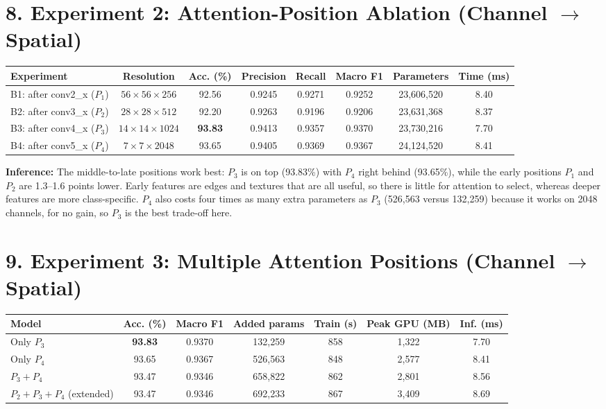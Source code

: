 \documentclass[10pt]{article}
\begin{document}
\section*{8. Experiment 2: Attention-Position Ablation (Channel $\rightarrow$ Spatial)}

\begin{center}
\small
\begin{tabular}{|l|c|c|c|c|c|c|c|}
\hline
Experiment & Resolution & Acc. (\%) & Precision & Recall & Macro F1 & Parameters & Time (ms)\\
\hline
B1: after conv2\_x ($P_1$) & $56\times56\times256$ & 92.56 & 0.9245 & 0.9271 & 0.9252 & 23{,}606{,}520 & 8.40\\
B2: after conv3\_x ($P_2$) & $28\times28\times512$ & 92.20 & 0.9263 & 0.9196 & 0.9206 & 23{,}631{,}368 & 8.37\\
B3: after conv4\_x ($P_3$) & $14\times14\times1024$ & \textbf{93.83} & 0.9413 & 0.9357 & 0.9370 & 23{,}730{,}216 & 7.70\\
B4: after conv5\_x ($P_4$) & $7\times7\times2048$ & 93.65 & 0.9405 & 0.9369 & 0.9367 & 24{,}124{,}520 & 8.41\\
\hline
\end{tabular}
\end{center}

\textbf{Inference:} The middle-to-late positions work best: $P_3$ is on top
(93.83\%) with $P_4$ right behind (93.65\%), while the early positions $P_1$
and $P_2$ are 1.3--1.6 points lower. Early features are edges and textures
that are all useful, so there is little for attention to select, whereas
deeper features are more class-specific. $P_4$ also costs four times as
many extra parameters as $P_3$ (526{,}563 versus 132{,}259) because it
works on 2048 channels, for no gain, so $P_3$ is the best trade-off here.

\section*{9. Experiment 3: Multiple Attention Positions (Channel $\rightarrow$ Spatial)}

\begin{center}
\small
\begin{tabular}{|l|c|c|c|c|c|c|}
\hline
Model & Acc. (\%) & Macro F1 & Added params & Train (s) & Peak GPU (MB) & Inf. (ms)\\
\hline
Only $P_3$ & \textbf{93.83} & 0.9370 & 132{,}259 & 858 & 1{,}322 & 7.70\\
Only $P_4$ & 93.65 & 0.9367 & 526{,}563 & 848 & 2{,}577 & 8.41\\
$P_3+P_4$ & 93.47 & 0.9346 & 658{,}822 & 862 & 2{,}801 & 8.56\\
$P_2+P_3+P_4$ (extended) & 93.47 & 0.9346 & 692{,}233 & 867 & 3{,}409 & 8.69\\
\hline
\end{tabular}
\end{center}
\end{document}
